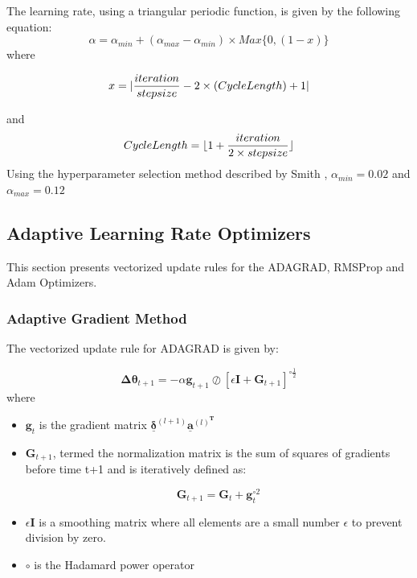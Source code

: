 \documentclass{article}
\begin{document}
The learning rate, using a triangular periodic function, is given by the following equation:
\begin{equation}
	\alpha = \alpha_{min} + (\alpha_{max} - \alpha_{min})\times Max\{0, (1-x)\}
\end{equation}
where 

\begin{equation}
	x = |\frac{iteration}{stepsize} -2\times{(Cycle \space Length)} + 1|
\end{equation}


and \begin{equation}
Cycle \space Length = \lfloor{1 + \frac{iteration}{2\times{stepsize}}}\rfloor
\end{equation}
Using the hyperparameter selection method described by Smith \cite{smith2017cyclical}, $\alpha_{min} = 0.02$ and $\alpha_{max} = 0.12$

\subsection{Adaptive Learning Rate Optimizers}
This section presents vectorized update rules for the ADAGRAD, RMSProp and Adam Optimizers. 
\subsubsection{Adaptive Gradient Method}
The vectorized update rule for ADAGRAD is given by:

\begin{equation}
\boldsymbol{\Delta{\theta}}_{t+1} = -\alpha\boldsymbol{g}_{t+1}\oslash[\epsilon\boldsymbol{I} + \boldsymbol{G}_{t+1}]^{\circ\frac{1}{2}}
\end{equation} 
where 
\begin{itemize}
	\item $\boldsymbol{g}_t$ is the gradient matrix $\underline{\boldsymbol{\delta}}^{(l+1)}\underline{\boldsymbol{a}}^{(l)^{\boldsymbol{T}}}$
	
	\item $\boldsymbol{G}_{t+1}$, termed the normalization matrix is the sum of squares of gradients before time t+1 and is iteratively defined as:
	
	\begin{equation}
	\boldsymbol{G}_{t+1} = \boldsymbol{G}_{t} + \boldsymbol{g}_{t}^{\circ{2}}
	\end{equation} 
	
	\item $\epsilon\boldsymbol{I}$ is a smoothing matrix where all elements are a small number $\epsilon$ to prevent division by zero.
	
	\item $\circ$ is the Hadamard power operator
\end{itemize}
\end{document}
